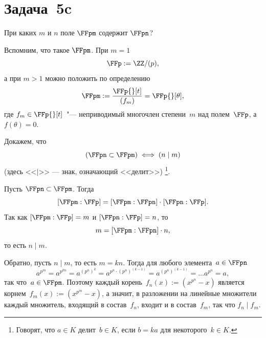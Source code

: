 \section{Задача~5c}

При каких $m$ и $n$ поле $\FFpm$ содержит $\FFpn$?

\begin{solution}
	Вспомним, что такое $\FFpm$. При $m = 1$
	\[
		\FFp := \ZZ/(p),
	\]
	а при $m > 1$ можно положить по определению
	\[
		\FFpm := \frac{\FFp{}[t]}{(f_m)} = \FFp{}[\theta]
		,
	\]
	где $f_m \in \FFp{}[t]$~"--- неприводимый многочлен степени~$m$ над полем~$\FFp$, а $f(\theta) = 0$.



	Докажем, что
	\[
		(\FFpn \subset \FFpm)
		\iff
		(n \mid m)
	\]
	(здесь <<$\mid$>> --- знак, означающий <<делит>>)%
	\footnote{%
		Говорят, что $a \in K$ делит~$b \in K$, если $b = ka$ для некоторого~$k \in K$.
	}.

	Пусть $\FFpn \subset \FFpm$. Тогда
	\[
		[\FFpm : \FFp] =
		[\FFpm : \FFpn] \cdot
		[\FFpn : \FFp]
		.
	\]
	Так как $[\FFpm : \FFp] = m$ и $[\FFpn : \FFp] = n$, то
	\[
		m = [\FFpm : \FFpn] \cdot n
		,
	\]
	то есть $n \mid m$.

	Обратно, пусть $n \mid m$, то есть $m = kn$. Тогда для любого элемента~$a \in \FFpn$
	\[
		a^{p^m} =
		a^{p^{kn}} =
		a^{(p^n)^k} =
		a^{p^n \cdot (p^n)^{(k-1)}} =
		a^{(p^n)^{(k-1)}} =
		\dots
		a^{p^n} =
		a,
	\]
	так что~$a \in \FFpm$. Поэтому каждый корень~$f_n(x) := (x^{p^n} - x)$ является корнем~$f_m(x) := (x^{p^m} - x)$, а значит, в разложении на линейные множители каждый множитель, входящий в состав~$f_n$, входит и в состав~$f_m$, так что $f_n \mid f_m$.
\end{solution}
